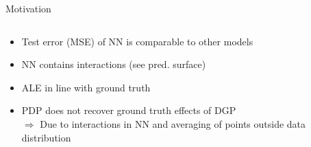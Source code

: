 \documentclass[11pt,compress,t,notes=noshow, aspectratio=169, xcolor=table]{beamer}
\begin{document}
\begin{frame}{Motivation}
\begin{columns}[T]
\begin{column}{0.35\textwidth}
\begin{itemize}
\item Test error (MSE) of NN is comparable to other models
\item NN contains interactions (see pred. surface)
\item<2> ALE in line with ground truth
\item<2> PDP does not recover ground truth effects of DGP \\
$\Rightarrow$ Due to interactions in NN and averaging of points outside data distribution
\end{itemize}

\end{column}
\end{columns}

\end{frame}
\end{document}
